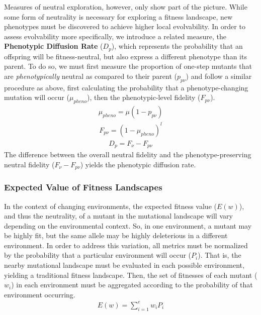 \documentclass[10pt,letterpaper]{article}
\begin{document}
Measures of neutral exploration, however, only show part of the picture. While some form of neutrality is necessary for exploring a fitness landscape, new phenotypes must be discovered to achieve higher local evolvability. In order to assess evolvability more specifically, we introduce a related measure, the \textbf{Phenotypic Diffusion Rate} ($D_p$), which represents the probability that an offspring will be fitness-neutral, but also express a different phenotype than its parent. To do so, we must first measure the proportion of one-step mutants that are \textit{phenotypically} neutral as compared to their parent ($p_{p\nu}$) and follow a similar procedure as above, first calculating the probability that a phenotype-changing mutation will occur ($\mu_{pheno}$), then the phenotypic-level fidelity ($F_{p\nu}$).
\begin{eqnarray}
\label{eq:phenotypic_mutation_rate}
	\mu_{pheno} = \mu (1- p_{p\nu})
\end{eqnarray}
\begin{eqnarray}
\label{eq:phenotypic_fidelity}
	F_{p\nu} = (1 - \mu_{pheno})^l
\end{eqnarray}
\begin{eqnarray}
\label{eq:phenotypic_diffusion_rate}
	D_p = F_\nu - F_{p\nu}
\end{eqnarray}
The difference between the overall neutral fidelity and the phenotype-preserving neutral fidelity ($F_\nu - F_{p\nu}$) yields the phenotypic diffusion rate.

\subsubsection*{Expected Value of Fitness Landscapes}
In the context of changing environments, the expected fitness value ($E(w)$), and thus the neutrality, of a mutant in the mutational landscape will vary depending on the environmental context. So, in one environment, a mutant may be highly fit, but the same allele may be highly deleterious in a different environment. In order to address this variation, all metrics must be normalized by the probability that a particular environment will occur ($P_i$). That is, the nearby mutational landscape must be evaluated in each possible environment, yielding a traditional fitness landscape. Then, the set of fitnesses of each mutant ($w_i$) in each environment must be aggregated according to the probability of that environment occurring.
\begin{eqnarray}
\label{eq:expected_fitness_value}
	E(w) = \displaystyle\sum_{i=1}^{e} w_i P_i
\end{eqnarray}
\end{document}
